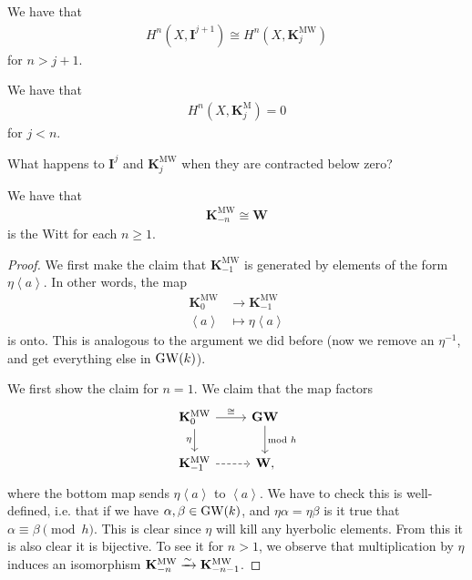 \documentclass[11pt,openany]{book}
\providecommand{\KM}{\mathbf{K}^\mathrm{M}}
\providecommand{\KMW}{\mathbf{K}^\mathrm{MW}}
\begin{document}
\begin{proposition} We have that
\begin{align*}
    H^n(X, \mathbf{I}^{j+1}) \cong H^n(X, \KMW_j)
\end{align*}
for $n > j+1$.
\end{proposition}

\begin{proposition} We have that
\begin{align*}
    H^n(X, \KM_j) = 0
\end{align*}
for $j<n$.
\end{proposition}

What happens to $\mathbf{I}^j$ and $\KMW_j$ when they are contracted below zero?

\begin{proposition} We have that
\begin{align*}
    \KMW_{-n} \cong \mathbf{W}
\end{align*}
is the Witt for each $n \ge 1$.
\end{proposition}
\begin{proof} We first make the claim that $\KMW_{-1}$ is generated by elements of the form $\eta \left\langle a \right\rangle$. In other words, the map
\begin{align*}
    \KMW_0 &\to \KMW_{-1} \\
    \left\langle a \right\rangle &\mapsto \eta \left\langle a \right\rangle
\end{align*}
is onto. This is analogous to the argument we did before (now we remove an $\eta^{-1}$, and get everything else in $\mathrm{GW}(k)$).


We first show the claim for $n=1$. We claim that the map factors
\[ \begin{tikzcd}
    \KMW_0\rar["\cong"]\dar["\eta" left] & \mathbf{GW}\dar["\text{mod }h" right]\\
    \KMW_{-1}\rar[dashed] & \mathbf{W},
\end{tikzcd} \]
where the bottom map sends $\eta \left\langle a \right\rangle$ to $\left\langle a \right\rangle$.
We have to check this is well-defined, i.e. that if we have $\alpha,\beta\in \mathrm{GW}(k)$, and $\eta \alpha = \eta\beta$ is it true that $\alpha \equiv \beta \pmod{h}$. This is clear since $\eta$ will kill any hyerbolic elements. From this it is also clear it is bijective. To see it for $n > 1$, we observe that multiplication by $\eta$ induces an isomorphism $\KMW_{-n}\xto{\sim} \KMW_{-n-1}$.
\end{proof}
\end{document}
